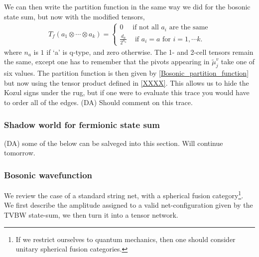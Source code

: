 \documentclass[12pt,a4paper]{article}
\newcommand{\tp}{\otimes}
\newcommand{\dave}[1]{{\color{ao(english)}\footnotesize{(DA) #1}}}
\begin{document}
We can then write the partition function in the same way we did for the bosonic state sum, 
but now with the modified tensors,
\begin{align}
T_f(a_1 \tp \cdots \tp a_k) = 
\begin{cases}
0 & \text{if not all $a_i$ are the same}\\
\frac{d_a}{2^{n_a}} & \text{ if $a_i = a$ for $i = 1,\cdots k$. }
\end{cases}
\end{align}
where $n_a$ is $1$ if `a' is q-type, and zero otherwise.
The 1- and 2-cell tensors remain the same, except one has to remember that the pivots appearing in $\tilde{\mu}_j^v$ take one of six values. 
The partition function is then given by \eqref{Bosonic_partition_function} but now using the tensor product defined in \eqref{XXXX}.
This allows us to hide the Kozul signs under the rug, but if one were to evaluate this trace you would have to order all of the edges.
\dave{Should comment on this trace.}


\subsubsection{Shadow world for fermionic state sum}
\dave{some of the below can be salveged into this section.
Will continue tomorrow.}




\subsubsection{Bosonic wavefunction}
We review the case of a standard string net, with a spherical fusion category\footnote{If we restrict ourselves to quantum mechanics, then one should consider unitary spherical fusion categories.}. 
We first describe the amplitude assigned to a valid net-configuration given by the TVBW state-sum, 
we then turn it into a tensor network. 
\end{document}
